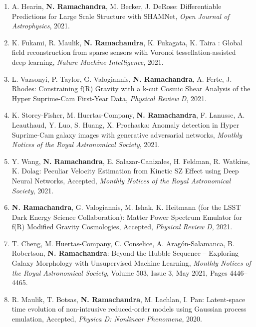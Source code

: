\documentclass[letterpaper]{article}
\begin{document}
\begin{enumerate}
\item A. Hearin, \textbf{N. Ramachandra}, M. Becker, J. DeRose: Differentiable Predictions for Large Scale Structure with SHAMNet, {\it Open Journal of Astrophysics}, 2021.

\item K. Fukami, R. Maulik, \textbf{N. Ramachandra}, K. Fukagata, K. Taira : Global field reconstruction from sparse sensors with Voronoi tessellation-assisted deep learning, {\it Nature Machine Intelligence}, 2021.


\item L. Vazsonyi, P. Taylor, G. Valogiannis, \textbf{N. Ramachandra}, A. Ferte, J. Rhodes: Constraining f(R) Gravity with a k-cut Cosmic Shear Analysis of the Hyper Suprime-Cam First-Year Data, {\it Physical Review D}, 2021. 

\item K. Storey-Fisher, M. Huertas-Company, \textbf{N. Ramachandra}, F. Lanusse, A. Leauthaud, Y. Luo, S. Huang,  X. Prochaska: Anomaly detection in Hyper Suprime-Cam galaxy images with generative
adversarial networks, {\it Monthly Notices of the Royal Astronomical Society}, 2021.

\item Y. Wang, \textbf{N. Ramachandra}, E. Salazar-Canizales, H. Feldman, R. Watkins, K. Dolag: Peculiar Velocity Estimation from Kinetic SZ Effect using Deep Neural Networks, Accepted, {\it Monthly Notices of the Royal Astronomical Society}, 2021.

\item \textbf{N. Ramachandra}, G. Valogiannis, M. Ishak, K. Heitmann (for the LSST Dark Energy Science Collaboration): Matter Power Spectrum Emulator for f(R) Modified Gravity Cosmologies, Accepted, {\it Physical Review D}, 2021.

\item T. Cheng, M. Huertas-Company, C. Conselice, A. Aragón-Salamanca, B. Robertson, \textbf{N. Ramachandra}: Beyond the Hubble Sequence -- Exploring Galaxy Morphology with Unsupervised Machine Learning, {\it Monthly Notices of the Royal Astronomical Society}, Volume 503, Issue 3, May 2021, Pages 4446–4465.

\item R. Maulik, T. Botsas, \textbf{N. Ramachandra}, M. Lachlan, I. Pan: Latent-space time evolution of non-intrusive reduced-order models using Gaussian process emulation, Accepted, {\it Physica D: Nonlinear Phenomena}, 2020.






\end{enumerate}
\end{document}
